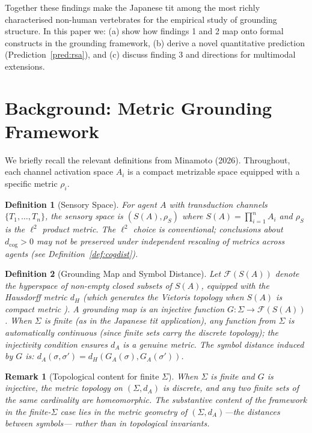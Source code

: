 \documentclass[12pt]{article}
\newtheorem{definition}{Definition}
\newtheorem{remark}{Remark}
\begin{document}
Together these findings make the Japanese tit
among the most richly characterised non-human vertebrates
for the empirical study of grounding structure.
In this paper we:
(a) show how findings 1 and 2 map onto formal constructs
in the grounding framework,
(b) derive a novel quantitative prediction (Prediction~\ref{pred:rsa}),
and (c) discuss finding 3 and directions for multimodal extensions.

\section{Background: Metric Grounding Framework}

We briefly recall the relevant definitions from Minamoto (2026).
Throughout, each channel activation space $A_i$
is a compact metrizable space
equipped with a specific metric $\rho_i$.

\begin{definition}[Sensory Space]
\label{def:sensory}
For agent $A$ with transduction channels $\{T_1, \ldots, T_n\}$,
the \emph{sensory space} is
$(S(A), \rho_S)$ where $S(A) = \prod_{i=1}^n A_i$
and $\rho_S$ is the $\ell^2$ product metric.
The $\ell^2$ choice is conventional;
conclusions about $d_\mathrm{cog} > 0$ may not be preserved
under independent rescaling of metrics across agents
(see Definition~\ref{def:cogdist}).
\end{definition}

\begin{definition}[Grounding Map and Symbol Distance]
\label{def:groundmap}
Let $\mathcal{F}(S(A))$ denote the hyperspace of
non-empty closed subsets of $S(A)$,
equipped with the Hausdorff metric $d_H$
(which generates the Vietoris topology
when $S(A)$ is compact metric \citep{beer1993}).
A \emph{grounding map} is an injective function
$G: \Sigma \to \mathcal{F}(S(A))$.
When $\Sigma$ is finite (as in the Japanese tit application),
any function from $\Sigma$ is automatically continuous
(since finite sets carry the discrete topology);
the injectivity condition ensures $d_A$ is a genuine metric.
The \emph{symbol distance} induced by $G$ is:
$d_A(\sigma, \sigma') = d_H(G_A(\sigma), G_A(\sigma'))$.
\end{definition}

\begin{remark}[Topological content for finite $\Sigma$]
\label{rem:discrete}
When $\Sigma$ is finite and $G$ is injective,
the metric topology on $(\Sigma, d_A)$ is discrete,
and any two finite sets of the same cardinality are homeomorphic.
The substantive content of the framework
in the finite-$\Sigma$ case lies in the \emph{metric geometry}
of $(\Sigma, d_A)$---the distances between symbols---
rather than in topological invariants.
\end{remark}
\end{document}
